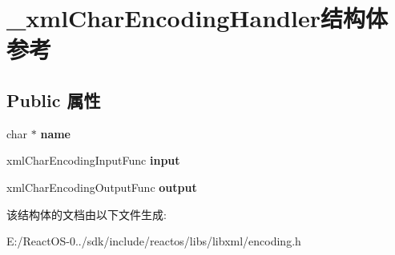 \hypertarget{struct__xml_char_encoding_handler}{}\section{\+\_\+xml\+Char\+Encoding\+Handler结构体 参考}
\label{struct__xml_char_encoding_handler}
\subsection*{Public 属性}
\begin{DoxyCompactItemize}
\item 
\mbox{\label{struct__xml_char_encoding_handler_a9cafc98368bd39e4c7db5cd68da1235e}} 
char $\ast$ {\bfseries name}
\item 
\mbox{\label{struct__xml_char_encoding_handler_a83ab9925e70e9cf4570e0606e04ce83d}} 
xml\+Char\+Encoding\+Input\+Func {\bfseries input}
\item 
\mbox{\label{struct__xml_char_encoding_handler_a0431378526b6f123baa7d15454b7c992}} 
xml\+Char\+Encoding\+Output\+Func {\bfseries output}
\end{DoxyCompactItemize}


该结构体的文档由以下文件生成\+:\begin{DoxyCompactItemize}
\item 
E\+:/\+React\+O\+S-\/0../sdk/include/reactos/libs/libxml/encoding.\+h\end{DoxyCompactItemize}

